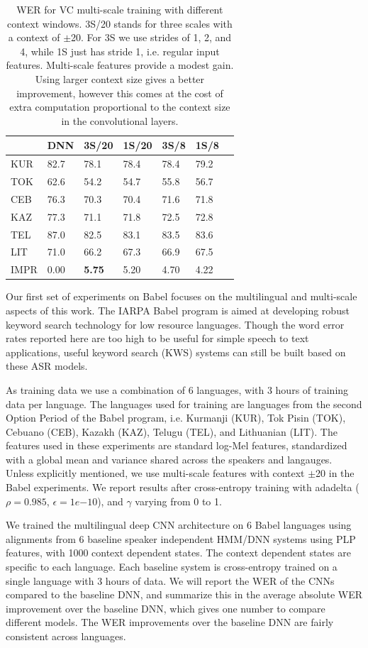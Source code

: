 \documentclass{article}
\begin{document}
\begin{table}[ht]
\centering
\begin{tabular}{l | l | lllll}
     & DNN  & 3S/20 & 1S/20 & 3S/8 & 1S/8 \\ \hline
KUR  & 82.7 & 78.1  & 78.4  & 78.4 & 79.2 \\
TOK  & 62.6 & 54.2  & 54.7  & 55.8 & 56.7 \\
CEB  & 76.3 & 70.3  & 70.4  & 71.6 & 71.8 \\
KAZ  & 77.3 & 71.1  & 71.8  & 72.5 & 72.8 \\
TEL  & 87.0 & 82.5  & 83.1  & 83.5 & 83.6 \\
LIT  & 71.0 & 66.2  & 67.3  & 66.9 & 67.5 \\ \hline
IMPR & 0.00 & \bf{5.75}  & 5.20  & 4.70 & 4.22
\end{tabular}
\caption{\label{tab:multiscale}WER for VC multi-scale training with different context windows.
    3S/20 stands for three scales with a context of $\pm$20.
    For 3S we use strides of 1, 2, and 4, while 1S just has stride 1, i.e. regular input features.
    Multi-scale features provide a modest gain. 
    Using larger context size gives a better improvement, however this comes
    at the cost of extra computation proportional to the context size in the convolutional layers.}
\end{table}

Our first set of experiments on Babel focuses on the multilingual and multi-scale
aspects of this work.
The IARPA Babel program is aimed at developing robust keyword search technology
for low resource languages.
Though the word error rates reported here are too high to be useful for simple speech to text applications,
useful keyword search (KWS) systems can still be built based on these ASR models.

As training data we use a combination of 6 languages, with 3 hours
of training data per language.
The languages used for training are languages from the second Option Period of the Babel
program, i.e. Kurmanji (KUR), Tok Pisin (TOK), Cebuano (CEB), Kazakh (KAZ), Telugu (TEL),
and Lithuanian (LIT).
The features used in these experiments are standard log-Mel features,
standardized with a global mean and variance shared across the speakers and langauges.
Unless explicitly mentioned, we use multi-scale features with context $\pm$20 in the Babel experiments.
We report results after cross-entropy training with adadelta ($\rho=0.985$, $\epsilon=1e{-10}$),
and $\gamma$ varying from 0 to 1.

We trained the multilingual deep CNN architecture on 6 Babel languages using
alignments from 6 baseline speaker independent HMM/DNN systems using PLP features,
with 1000 context dependent states.
The context dependent states are specific to each language.
Each baseline system is cross-entropy trained on a single language with 3 hours of data.
We will report the WER of the CNNs compared to the baseline DNN,
and summarize this in the average absolute WER improvement over the baseline DNN,
which gives one number to compare different models.
The WER improvements over the baseline DNN are fairly consistent across languages.
\end{document}
